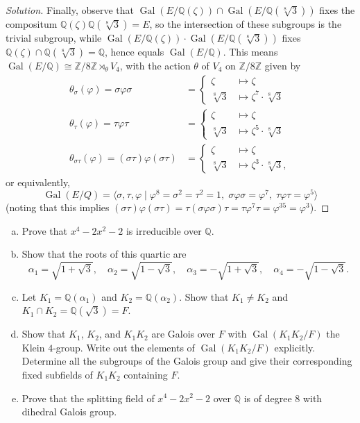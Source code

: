 \documentclass[10pt]{article}
\providecommand{\Gal}{\operatorname{Gal}}
\providecommand{\QQ}{\mathbb Q}
\providecommand{\ZZ}{\mathbb Z}
\providecommand{\ii}{\item}
\newenvironment{soln}{\begin{proof}[Solution]}{\end{proof}}
\begin{document}
\begin{soln}
    Finally, observe that $\Gal(E/\QQ(\zeta))\cap\Gal(E/\QQ(\sqrt[8]3))$
    fixes the compositum $\QQ(\zeta)\QQ(\sqrt[8]3) = E$,
    so the intersection of these subgroups is the trivial subgroup,
    while $\Gal(E/\QQ(\zeta))\cdot\Gal(E/\QQ(\sqrt[8]3))$ fixes
    $\QQ(\zeta)\cap\QQ(\sqrt[8]3) = \QQ$, hence equals $\Gal(E/\QQ)$.
    This means $\Gal(E/\QQ)\cong \ZZ/8\ZZ\rtimes_\theta V_4$,
    with the action $\theta$ of $V_4$ on $\ZZ/8\ZZ$ given by
    \begin{align*}
        \theta_\sigma(\varphi) = \sigma\varphi\sigma
	&=
	\begin{cases}
	    \zeta&\mapsto\zeta\\
	    \sqrt[8]3&\mapsto\zeta^7\cdot\sqrt[8]3
	\end{cases}\\
	\theta_\tau(\varphi) = \tau\varphi\tau
	&=
	\begin{cases}
	    \zeta&\mapsto\zeta\\
	    \sqrt[8]3&\mapsto\zeta^5\cdot\sqrt[8]3
	\end{cases}\\
	\theta_{\sigma\tau}(\varphi) = (\sigma\tau)\varphi(\sigma\tau)
	&=
	\begin{cases}
	    \zeta&\mapsto\zeta\\
	    \sqrt[8]3&\mapsto\zeta^3\cdot\sqrt[8]3,
	\end{cases}
    \end{align*}
    or equivalently,
    \begin{equation*}
        \Gal(E/Q) = \langle\sigma,\tau,\varphi\mid
	\varphi^8 = \sigma^2 = \tau^2 = 1,\;
	\sigma\varphi\sigma = \varphi^7,\;
	\tau\varphi\tau = \varphi^5\rangle
    \end{equation*}
    (noting that this implies
    $(\sigma\tau)\varphi(\sigma\tau)
    = \tau(\sigma\varphi\sigma)\tau
    = \tau\varphi^7\tau
    = \varphi^{35} = \varphi^3$).
\end{soln}

\pagebreak
\begin{problem}
    [\S14.2\#16]
    \begin{enumerate}[(a)]
        \ii Prove that $x^4 - 2x^2 - 2$ is irreducible over $\QQ$.
	\ii Show that the roots of this quartic are
	\begin{equation*}
	    \alpha_1 = \sqrt{1 + \sqrt 3},\quad
	    \alpha_2 = \sqrt{1 - \sqrt 3},\quad
	    \alpha_3 = -\sqrt{1 + \sqrt 3},\quad
	    \alpha_4 = -\sqrt{1 - \sqrt 3}.
	\end{equation*}
	\ii Let $K_1 = \QQ(\alpha_1)$ and $K_2 = \QQ(\alpha_2)$.
	Show that $K_1\ne K_2$ and $K_1\cap K_2 = \QQ(\sqrt 3) = F$.
	\ii Show that $K_1$, $K_2$, and $K_1K_2$ are Galois over $F$
	with $\Gal(K_1K_2/F)$ the Klein $4$-group.
	Write out the elements of $\Gal(K_1K_2/F)$ explicitly.
	Determine all the subgroups of the Galois group
	and give their corresponding fixed subfields of
	$K_1K_2$ containing $F$.
	\ii Prove that the splitting field of $x^4 - 2x^2 - 2$ over $\QQ$
	is of degree $8$ with dihedral Galois group.
    \end{enumerate}
\end{problem}
\end{document}
